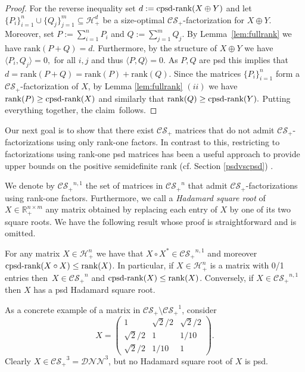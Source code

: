 \documentclass{siamart}
\begin{document}
{{{\begin{proof}
For the reverse  inequality  set $d:={\mathrm{cpsd}\textnormal{-rank}}(X\oplus Y)$ and let   $\{P_i\}_{i=1}^{n}\cup\{Q_j\}_{j=1}^m\subseteq {\mathcal{H}}^d_+$ be a size-optimal   ${\mathcal{CS}_+}$-factorization for $X\oplus Y$. Moreover, set $P:=
\sum_{i=1}^nP_i$ and $Q:=\sum_{j=1}^mQ_j$.  By Lemma~\ref{lem:fullrank} we have     $ {\mathrm{rank}}  (P+Q)=d.$
Furthermore, by the structure of $X\oplus Y$  we have  ${\langle} P_i,Q_j{\rangle} =0,$ for all $i,j$ and thus ${\langle} P,Q{\rangle}=0$. As  $P,Q$ are psd this implies that  $d={\mathrm{rank}}(P+Q)={\mathrm{rank}}(P)+{\mathrm{rank}}(Q).$
Since the matrices $\{P_i\}_{i=1}^n$ form a ${\mathcal{CS}_+}$-factorization of $X$, by Lemma \ref{lem:fullrank} $(ii)$  we have  ${\mathrm{rank}}(P) \ge {\mathrm{cpsd}\textnormal{-rank}}(X)$  and similarly
 that ${\mathrm{rank}}(Q)\ge {\mathrm{cpsd}\textnormal{-rank}}(Y).$ Putting everything together, the claim~follows.
\end{proof}
\medskip

Our next goal is to show that there exist  ${\mathcal{CS}_+}$ matrices  that do
not admit ${\mathcal{CS}_+}$-factorizations using only rank-one factors. In contrast to this,
  restricting to  factorizations using  rank-one  psd matrices has been a  useful approach to provide upper bounds on the
{positive semidefinite rank (cf. Section \ref{psdvscpsd})}
\cite{WL,FGPRT}.

We denote by ${\mathcal{CS}_+}^{n,1}$ {the set of  matrices} in
${\mathcal{CS}_+}^n$ that admit ${\mathcal{CS}_+}$-factorizations using rank-one factors.
Furthermore, we call a {\em Hadamard square root} of $X\in
{\mathbb{R}}^{n\times m}_{+}$ any matrix obtained by replacing each entry of
$X$ by one of its two square roots. We have the following result
whose proof is straightforward and is omitted.
\medskip

\begin{lemma}\label{lem:squareroot}
For any  matrix  $X\in {\mathcal{H}}^n_+$
we have that
$X\circ X^*\in
{\mathcal{CS}_+}^{n,1}$   and   moreover  ${\mathrm{cpsd}\textnormal{-rank}}({X\circ X})\le {\mathrm{rank}}(X)$.  In particular, if $X\in {\mathcal{H}}^n_+$ is a matrix with  0/1 entries   then~$X\in {\mathcal{CS}_+}^n$ and ${\mathrm{cpsd}\textnormal{-rank}}(X)\le {\mathrm{rank}}(X)$. Conversely, if
$X\in {\mathcal{CS}_+}^{n,1}$ then $X$ has a psd Hadamard square root.
\end{lemma}
\vspace{0.1cm} 

As a concrete example of a matrix {in} ${\mathcal{CS}_+}\setminus {\mathcal{CS}_+}^1$, {consider}  \begin{equation} X=\begin{pmatrix}
1 & \sqrt{2}/2 & \sqrt{2}/2\\
\sqrt{2}/2 & 1 & 1/10\\
\sqrt{2}/2 & 1/10 & 1
\end{pmatrix}.
\end{equation}
Clearly  $X\in {\mathcal{CS}_+}^3 {= {\mathcal{DNN}}^3}$, but  no Hadamard square root of $X$ is psd.

}}}
\end{document}

